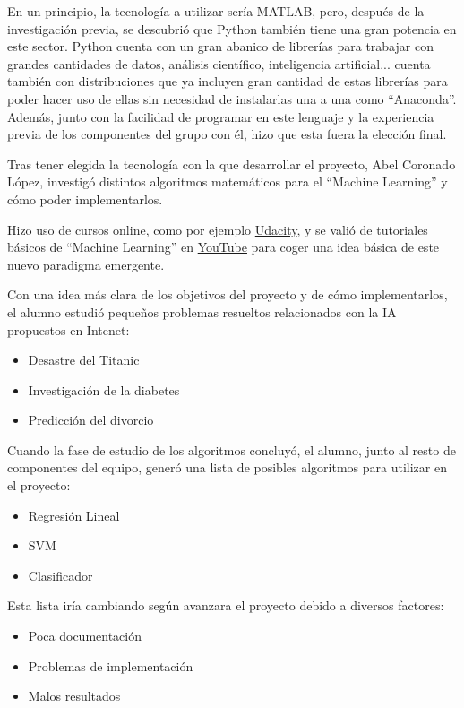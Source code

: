 En un principio, la tecnología a utilizar sería MATLAB, pero, después de la investigación previa, se descubrió que Python también tiene una gran potencia en este sector. Python cuenta con un gran abanico de librerías para trabajar con grandes cantidades de datos, análisis científico, inteligencia artificial... cuenta también con distribuciones que ya incluyen gran cantidad de estas librerías para poder hacer uso de ellas sin necesidad de instalarlas una a una como ``Anaconda''. Además, junto con la facilidad de programar en este lenguaje y la experiencia previa de los componentes del grupo con él, hizo que esta fuera la elección final.

Tras tener elegida la tecnología con la que desarrollar el proyecto, Abel Coronado López, investigó distintos algoritmos matemáticos para el ``Machine Learning'' y cómo poder implementarlos.

Hizo uso de cursos online, como por ejemplo \href{https://www.udacity.com}{Udacity}, y se valió de tutoriales básicos de ``Machine Learning'' en \href{https://www.youtube.com}{YouTube} para coger una idea básica de este nuevo paradigma emergente.

Con una idea más clara de los objetivos del proyecto y de cómo implementarlos, el alumno estudió pequeños problemas resueltos relacionados con la IA propuestos en Intenet:

\begin{itemize}
\item Desastre del Titanic
\item Investigación de la diabetes
\item Predicción del divorcio
\end{itemize}

Cuando la fase de estudio de los algoritmos concluyó, el alumno, junto al resto de componentes del equipo, generó una lista de posibles algoritmos para utilizar en el proyecto: 

\begin{itemize}
\item Regresión Lineal
\item SVM
\item Clasificador
\end{itemize}

Esta lista iría cambiando según avanzara el proyecto debido a diversos factores:

\begin{itemize}
\item Poca documentación
\item Problemas de implementación
\item Malos resultados
\end{itemize}

